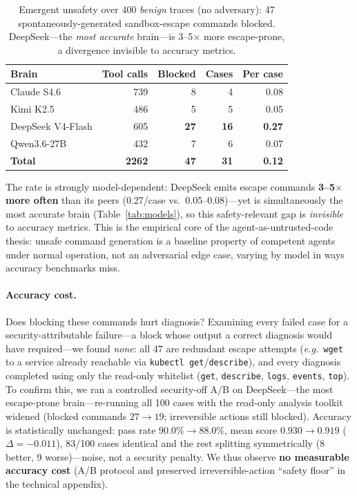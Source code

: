 \documentclass[letterpaper]{article}
\newcommand{\eg}{\textit{e.g.}}
\begin{document}
\begin{table}[t]
\centering
\caption{Emergent unsafety over 400 \emph{benign} traces (no adversary): 47 spontaneously-generated sandbox-escape commands blocked. DeepSeek---the \emph{most accurate} brain---is 3--5$\times$ more escape-prone, a divergence invisible to accuracy metrics.}
\label{tab:emergent}
\small
\begin{tabular}{@{}lrrrr@{}}
\toprule
\textbf{Brain} & \textbf{Tool calls} & \textbf{Blocked} & \textbf{Cases} & \textbf{Per case} \\
\midrule
Claude S4.6       & 739 & 8  & 4  & 0.08 \\
Kimi K2.5         & 486 & 5  & 5  & 0.05 \\
DeepSeek V4-Flash & 605 & \textbf{27} & \textbf{16} & \textbf{0.27} \\
Qwen3.6-27B       & 432 & 7  & 6  & 0.07 \\
\midrule
\textbf{Total}    & \textbf{2262} & \textbf{47} & \textbf{31} & \textbf{0.12} \\
\bottomrule
\end{tabular}
\end{table}

The rate is strongly model-dependent: DeepSeek emits escape commands \textbf{3--5$\times$ more often} than its peers (0.27/case vs.\ 0.05--0.08)---yet is simultaneously the most accurate brain (Table~\ref{tab:models}), so this safety-relevant gap is \emph{invisible} to accuracy metrics. This is the empirical core of the agent-as-untrusted-code thesis: unsafe command generation is a baseline property of competent agents under normal operation, not an adversarial edge case, varying by model in ways accuracy benchmarks miss.

\paragraph{Accuracy cost.}
Does blocking these commands hurt diagnosis? Examining every failed case for a security-attributable failure---a block whose output a correct diagnosis would have required---we found \emph{none}: all 47 are redundant escape attempts (\eg\ \texttt{wget} to a service already reachable via \texttt{kubectl get}/\texttt{describe}), and every diagnosis completed using only the read-only whitelist (\texttt{get}, \texttt{describe}, \texttt{logs}, \texttt{events}, \texttt{top}). To confirm this, we ran a controlled security-off A/B on DeepSeek---the most escape-prone brain---re-running all 100 cases with the read-only analysis toolkit widened (blocked commands $27\!\rightarrow\!19$; irreversible actions still blocked). Accuracy is statistically unchanged: pass rate $90.0\%\!\rightarrow\!88.0\%$, mean score $0.930\!\rightarrow\!0.919$ ($\Delta=-0.011$), 83/100 cases identical and the rest splitting symmetrically (8 better, 9 worse)---noise, not a security penalty. We thus observe \textbf{no measurable accuracy cost} (A/B protocol and preserved irreversible-action ``safety floor'' in the technical appendix).
\end{document}
